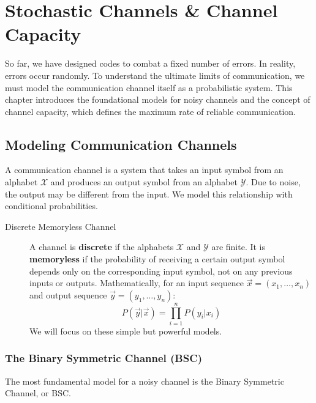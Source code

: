
\section{Stochastic Channels \& Channel Capacity}

So far, we have designed codes to combat a fixed number of errors. In reality, errors occur randomly. To understand the ultimate limits of communication, we must model the communication channel itself as a probabilistic system. This chapter introduces the foundational models for noisy channels and the concept of channel capacity, which defines the maximum rate of reliable communication.

\subsection{Modeling Communication Channels}

A communication channel is a system that takes an input symbol from an alphabet $\mathcal{X}$ and produces an output symbol from an alphabet $\mathcal{Y}$. Due to noise, the output may be different from the input. We model this relationship with conditional probabilities.

\begin{description}
    \item[Discrete Memoryless Channel] A channel is \textbf{discrete} if the alphabets $\mathcal{X}$ and $\mathcal{Y}$ are finite. It is \textbf{memoryless} if the probability of receiving a certain output symbol depends only on the corresponding input symbol, not on any previous inputs or outputs. Mathematically, for an input sequence $\vec{x} = (x_1, \dots, x_n)$ and output sequence $\vec{y} = (y_1, \dots, y_n)$:
    \[ P(\vec{y}|\vec{x}) = \prod_{i=1}^n P(y_i|x_i) \]
    We will focus on these simple but powerful models.
\end{description}

\subsubsection{The Binary Symmetric Channel (BSC)}

The most fundamental model for a noisy channel is the Binary Symmetric Channel, or BSC.

